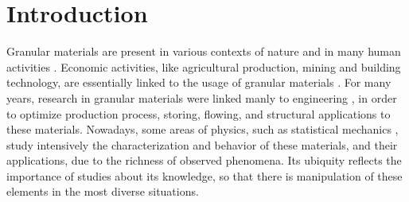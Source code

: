 
\chapter{Introduction}
\label{chap:Introducao}


    Granular materials are present in various contexts of nature and in many human activities \cite{Sands_Powders_and_Grains, The_Physics_of_Granular_Media, Granular_Physics, Micromechanics_of_Granular_Materials, Granular_Media_Between_Fluid_and_Solid}. Economic activities, like agricultural production, mining and building technology, are essentially linked to the usage of granular materials \cite{Sands_Powders_and_Grains}. For many years, research in granular materials were linked manly to engineering \cite{Versuche_uber_Getreidedruck_in_Silozellen, Janssen}, in order to optimize production process, storing, flowing, and structural applications to these materials. Nowadays, some areas of physics, such as statistical mechanics \cite{Unifying_Concepts_in_Granular_Media_and_Glasses}, study intensively the characterization and behavior of these materials, and their applications, due to the richness of observed phenomena. Its ubiquity reflects the importance of studies about its knowledge, so that there is manipulation of these elements in the most diverse situations.

